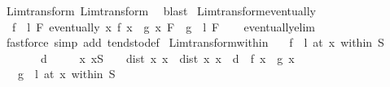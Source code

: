 \begin{isabellebody}
\ Lim{\isacharunderscore}{\kern0pt}transform\ Lim{\isacharunderscore}{\kern0pt}transform{}\ \isamarkupfalse%
\ blast%
\endisatagproof
{\isafoldproof}%
%
\isadelimproof
\isanewline
%
\endisadelimproof
\isanewline
{}\isamarkupfalse%
\ Lim{\isacharunderscore}{\kern0pt}transform{\isacharunderscore}{\kern0pt}eventually{\isacharcolon}{\kern0pt}\isanewline
\ \ {\isachardoublequoteopen}{\isasymlbrakk}{\isacharparenleft}{\kern0pt}f\ {\isasymlonglongrightarrow}\ l{\isacharparenright}{\kern0pt}\ F{\isacharsemicolon}{\kern0pt}\ eventually\ {\isacharparenleft}{\kern0pt}{\isasymlambda}x{\isachardot}{\kern0pt}\ f\ x\ {\isacharequal}{\kern0pt}\ g\ x{\isacharparenright}{\kern0pt}\ F{\isasymrbrakk}\ {\isasymLongrightarrow}\ {\isacharparenleft}{\kern0pt}g\ {\isasymlonglongrightarrow}\ l{\isacharparenright}{\kern0pt}\ F{\isachardoublequoteclose}\isanewline
%
\isadelimproof
\ \ %
\endisadelimproof
%
\isatagproof
{}\isamarkupfalse%
\ eventually{\isacharunderscore}{\kern0pt}elim{}\ \isamarkupfalse%
\ {\isacharparenleft}{\kern0pt}fastforce\ simp\ add{\isacharcolon}{\kern0pt}\ tendsto{\isacharunderscore}{\kern0pt}def{\isacharparenright}{\kern0pt}%
\endisatagproof
{\isafoldproof}%
%
\isadelimproof
\isanewline
%
\endisadelimproof
\isanewline
{}\isamarkupfalse%
\ Lim{\isacharunderscore}{\kern0pt}transform{\isacharunderscore}{\kern0pt}within{\isacharcolon}{\kern0pt}\isanewline
\ \ \ {\isachardoublequoteopen}{\isacharparenleft}{\kern0pt}f\ {\isasymlonglongrightarrow}\ l{\isacharparenright}{\kern0pt}\ {\isacharparenleft}{\kern0pt}at\ x\ within\ S{\isacharparenright}{\kern0pt}{\isachardoublequoteclose}\isanewline
\ \ \ \ \ {\isachardoublequoteopen}{}\ {\isacharless}{\kern0pt}\ d{\isachardoublequoteclose}\isanewline
\ \ \ \ \ {\isachardoublequoteopen}{\isasymAnd}x{\isacharprime}{\kern0pt}{\isachardot}{\kern0pt}\ x{\isacharprime}{\kern0pt}{\isasymin}S\ {\isasymLongrightarrow}\ {}\ {\isacharless}{\kern0pt}\ dist\ x{\isacharprime}{\kern0pt}\ x\ {\isasymLongrightarrow}\ dist\ x{\isacharprime}{\kern0pt}\ x\ {\isacharless}{\kern0pt}\ d\ {\isasymLongrightarrow}\ f\ x{\isacharprime}{\kern0pt}\ {\isacharequal}{\kern0pt}\ g\ x{\isacharprime}{\kern0pt}{\isachardoublequoteclose}\isanewline
\ \ \ {\isachardoublequoteopen}{\isacharparenleft}{\kern0pt}g\ {\isasymlonglongrightarrow}\ l{\isacharparenright}{\kern0pt}\ {\isacharparenleft}{\kern0pt}at\ x\ within\ S{\isacharparenright}{\kern0pt}{\isachardoublequoteclose}\isanewline

\end{isabellebody}
